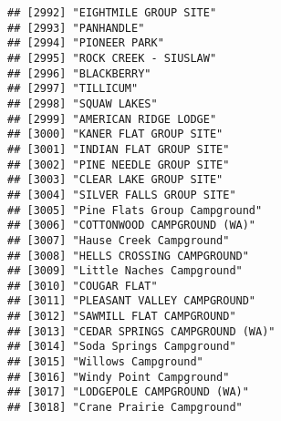 \documentclass[
]{article}
\begin{document}
\begin{verbatim}
## [2992] "EIGHTMILE GROUP SITE"                                                                
## [2993] "PANHANDLE"                                                                           
## [2994] "PIONEER PARK"                                                                        
## [2995] "ROCK CREEK - SIUSLAW"                                                                
## [2996] "BLACKBERRY"                                                                          
## [2997] "TILLICUM"                                                                            
## [2998] "SQUAW LAKES"                                                                         
## [2999] "AMERICAN RIDGE LODGE"                                                                
## [3000] "KANER FLAT GROUP SITE"                                                               
## [3001] "INDIAN FLAT GROUP SITE"                                                              
## [3002] "PINE NEEDLE GROUP SITE"                                                              
## [3003] "CLEAR LAKE GROUP SITE"                                                               
## [3004] "SILVER FALLS GROUP SITE"                                                             
## [3005] "Pine Flats Group Campground"                                                         
## [3006] "COTTONWOOD CAMPGROUND (WA)"                                                          
## [3007] "Hause Creek Campground"                                                              
## [3008] "HELLS CROSSING CAMPGROUND"                                                           
## [3009] "Little Naches Campground"                                                            
## [3010] "COUGAR FLAT"                                                                         
## [3011] "PLEASANT VALLEY CAMPGROUND"                                                          
## [3012] "SAWMILL FLAT CAMPGROUND"                                                             
## [3013] "CEDAR SPRINGS CAMPGROUND (WA)"                                                       
## [3014] "Soda Springs Campground"                                                             
## [3015] "Willows Campground"                                                                  
## [3016] "Windy Point Campground"                                                              
## [3017] "LODGEPOLE CAMPGROUND (WA)"                                                           
## [3018] "Crane Prairie Campground"                                                            

\end{verbatim}
\end{document}
